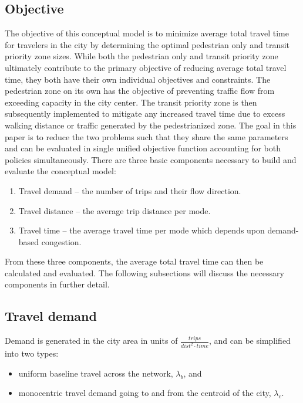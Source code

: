 \documentclass{elsarticle}\usepackage[]{graphicx}\usepackage[]{color}
\begin{document}
\subsection{Objective}
The objective of this conceptual model is to minimize average total travel time for travelers in the city by determining the optimal pedestrian only and transit priority zone sizes. While both the pedestrian only and transit priority zone ultimately contribute to the primary objective of reducing average total travel time, they both have their own individual objectives and constraints. The pedestrian zone on its own has the objective of preventing traffic flow from exceeding capacity in the city center. The transit priority zone is then subsequently implemented to mitigate any increased travel time due to excess walking distance or traffic generated by the pedestrianized zone. The goal in this paper is to reduce the two problems such that they share the same parameters and can be evaluated in single unified objective function accounting for both policies simultaneously. 
There are three basic components necessary to build and evaluate the conceptual model:

\begin{enumerate}
    \item Travel demand -- the number of trips and their flow direction. 
    \item Travel distance -- the average trip distance per mode.
    \item Travel time -- the average travel time per mode which depends upon demand-based congestion.
\end{enumerate}

From these three components, the average total travel time can then be calculated and evaluated. The following subsections will discuss the necessary components in further detail.

\subsection{Travel demand}
Demand is generated in the city area in units of $\frac{trips}{dist^2 \cdot time}$, and can be simplified into two types:

\begin{itemize}
    \item uniform baseline travel across the network, $\lambda_b$, and 
    \item monocentric travel demand going to and from the centroid of the city, $\lambda_c$. 
\end{itemize}
\end{document}
